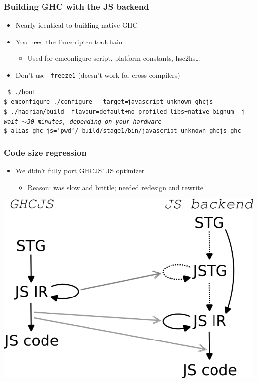 \documentclass[aspectratio=169]{beamer}
\begin{document}
\begin{frame}[fragile]
\frametitle{Building GHC with the JS backend}
\begin{itemize}
\item Nearly identical to building native GHC
\item You need the Emscripten toolchain
\begin{itemize}
\item Used for emconfigure script, platform constants, hsc2hs…
\end{itemize}
  \item \alert{Don't use \texttt{--freeze1} (doesn't work for cross-compilers)}
\end{itemize}

\vspace{1cm}

\texttt
{\footnotesize
\$ ./boot \\
\$ \alert{emconfigure} ./configure -{}-target=\alert{javascript-unknown-ghcjs} \\
\$ ./hadrian/build --flavour=default+no\_profiled\_libs+\alert{native\_bignum} -j \\
\vspace{0.5cm}
\textit{wait $\sim$30 minutes, depending on your hardware} \\
\vspace{0.5cm}
\$ alias ghc-js=`pwd`/\_build/stage1/bin/javascript-unknown-ghcjs-ghc\\
}
\end{frame}


\begin{frame}
\frametitle{Code size regression}
\begin{itemize}
\item We didn’t fully port GHCJS’ JS optimizer
\begin{itemize}
\item Reason: was slow and brittle; needed redesign and rewrite
\end{itemize}
\end{itemize}
\hspace{1cm}
\begin{center}
\includegraphics[scale=0.4]{images/pipelines.png}
\end{center}
\end{frame}
\end{document}

